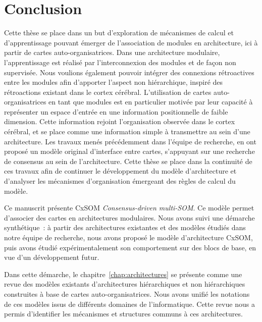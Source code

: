 \chapter*{Conclusion}

Cette thèse se place dans un but d'exploration de mécanismes de calcul et d'apprentissage pouvant émerger de l'association de modules en architecture, ici à partir de cartes auto-organisatrices.
Dans une architecture modulaire, l'apprentissage est réalisé par l'interconnexion des modules et de façon non supervisée. Nous voulions également pouvoir intégrer des connexions rétroactives entre les modules afin d'apporter l'aspect non hiérarchique, inspiré des rétroactions existant dans le cortex cérébral.
L'utilisation de cartes auto-organisatrices en tant que modules est en particulier motivée par leur capacité à représenter un espace d'entrée en une information positionnelle de faible dimension. Cette information rejoint l'organisation observée dans le cortex cérébral, et se place comme une information simple à transmettre au sein d'une architecture.
Les travaux menés précédemment dans l'équipe de recherche, en \cite{menard05,khouzam_2013,baheux_towards_2014} ont proposé un modèle original d'interface entre cartes, s'appuyant sur une recherche de consensus au sein de l'architecture. Cette thèse se place dans la continuité de ces travaux afin de continuer le développement du modèle d'architecture et d'analyser les mécanismes d'organisation émergeant des règles de calcul du modèle. 


Ce manuscrit présente CxSOM \emph{Consensus-driven multi-SOM}. Ce modèle permet d'associer des cartes en architectures modulaires.
Nous avons suivi une démarche synthétique~: à partir des architectures existantes et des modèles étudiés dans notre équipe de recherche, nous avons proposé le modèle d'architecture CxSOM, puis avons étudié expérimentalement son comportement sur des blocs de base, en vue d'un développement futur.

Dans cette démarche, le chapitre~\ref{chap:architectures} se présente comme une revue des modèles existants d'architectures hiérarchiques et non hiérarchiques construites à base de cartes auto-organisatrices. 
Nous avons unifié les notations de ces modèles issus de différents domaines de l'informatique. Cette revue nous a permis d'identifier les mécanismes et structures communs à ces architectures.


